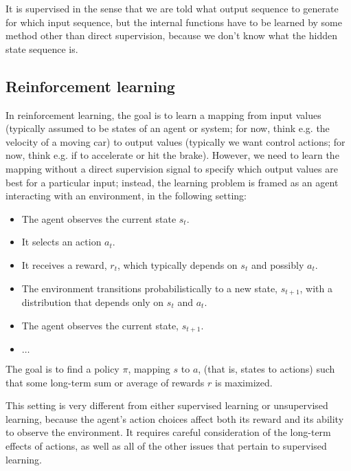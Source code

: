 It is supervised in the sense that we are told what output sequence to
generate for which input sequence, but the internal functions have to
be learned by some method other than direct supervision, because we
don't know what the hidden state sequence is.


\subsection{Reinforcement learning}

In reinforcement learning, the goal is to learn a mapping from input
values (typically assumed to be states of an agent or system; for now, think e.g. the velocity of a moving car)
to output values (typically we want control actions; for now, think e.g. if to accelerate or hit the brake). However, we need to learn the mapping without a direct supervision
signal to specify which output values are best for a particular
input; instead, the learning problem is framed as an agent interacting with an
environment, in the following setting:

\begin{itemize}

  \item The agent observes the current state ${s}_t$.

  \item It selects an action ${a}_t.$
  \item It receives a reward, ${r}_{t}$, which typically depends on ${s}_{t}$
        and possibly ${a}_{t}$.
  \item The environment transitions probabilistically to a new state,
        ${s}_{t+1}$, with a distribution that depends only on ${s}_{t}$
        and ${a}_{t}$.
  \item The agent observes the current state, ${s}_{t+1}$.
  \item $\ldots$
\end{itemize}
The goal is to find a policy $\pi$, mapping $s$ to $a$, (that is,
states to actions) such that some long-term sum or average of rewards
$r$ is maximized.

This setting is very different from either supervised learning or
unsupervised learning, because the agent's action choices affect both
its reward and its ability to observe the environment.
It requires careful consideration of the long-term effects of actions,
as well as all of the other issues that pertain to supervised
learning.



